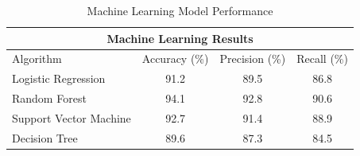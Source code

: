 \documentclass{article}
\begin{document}
		\begin{table}[h]
			\centering
			
			\caption{Machine Learning Model Performance}
			\label{tab:mlresults}
			
			\begin{tabular}{lccc}
				\toprule
				
				\multicolumn{4}{c}{\textbf{Machine Learning Results}} \\
				
				\midrule
				
				\rowcolor{blue!20}
				Algorithm & Accuracy (\%) & Precision (\%) & Recall (\%) \\
				
				\midrule
				
				Logistic Regression & 91.2 & 89.5 & 86.8 \\
				
				\rowcolor{gray!15}
				Random Forest & 94.1 & 92.8 & 90.6 \\
				
				Support Vector Machine & 92.7 & 91.4 & 88.9 \\
				
				\rowcolor{gray!15}
				Decision Tree & 89.6 & 87.3 & 84.5 \\
				
				\bottomrule
			\end{tabular}
			
		\end{table}
		
\end{document}
